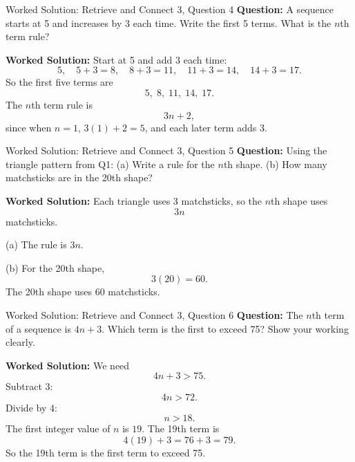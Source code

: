 \documentclass{beamer}
\begin{document}
\begin{frame}{Worked Solution: Retrieve and Connect 3, Question 4}
\textbf{Question:} A sequence starts at 5 and increases by 3 each time. Write the first 5 terms. What is the $n$th term rule?

\textbf{Worked Solution:} Start at 5 and add 3 each time:
\[
5,\quad 5+3=8,\quad 8+3=11,\quad 11+3=14,\quad 14+3=17.
\]
So the first five terms are
\[
5,\;8,\;11,\;14,\;17.
\]
The $n$th term rule is
\[
3n+2,
\]
since when $n=1$, $3(1)+2=5$, and each later term adds 3.
\end{frame}

\begin{frame}{Worked Solution: Retrieve and Connect 3, Question 5}
\textbf{Question:} Using the triangle pattern from Q1: (a) Write a rule for the $n$th shape. (b) How many matchsticks are in the 20th shape?

\textbf{Worked Solution:} Each triangle uses 3 matchsticks, so the $n$th shape uses
\[
3n
\]
matchsticks.

(a) The rule is $3n$.

(b) For the 20th shape,
\[
3(20)=60.
\]
The 20th shape uses 60 matchsticks.
\end{frame}

\begin{frame}{Worked Solution: Retrieve and Connect 3, Question 6}
\textbf{Question:} The $n$th term of a sequence is $4n+3$. Which term is the first to exceed 75? Show your working clearly.

\textbf{Worked Solution:} We need
\[
4n+3>75.
\]
Subtract 3:
\[
4n>72.
\]
Divide by 4:
\[
n>18.
\]
The first integer value of $n$ is $19$. The 19th term is
\[
4(19)+3=76+3=79.
\]
So the 19th term is the first term to exceed 75.
\end{frame}
\end{document}
